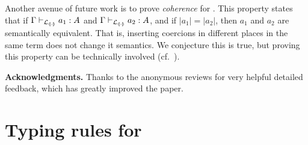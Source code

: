 \documentclass[runningheads]{llncs}
\begin{document}
Another avenue of future work is to prove \emph{coherence} for \lcata.
This property states that if $\Gamma \vdash_{\mathcal{L}_{{\llparenthesis \cdot \rrparenthesis}}} a_1 : A$ and
$\Gamma \vdash_{\mathcal{L}_{{\llparenthesis \cdot \rrparenthesis}}} a_2 : A$, and if $|a_1| = |a_2|$, then $a_1$
and $a_2$ are semantically equivalent.  That is, inserting coercions
in different places in the same term does not change it semantics.  We
conjecture this is true, but proving this property can be technically
involved (cf.~\cite{biernacki18}).

\textbf{Acknowledgments.} Thanks to the anonymous reviews for very helpful
detailed feedback, which has greatly improved the paper.

\appendix












\section{Typing rules for \lcataSub}
\label{app:typing-rules-lcataSub}
\end{document}
